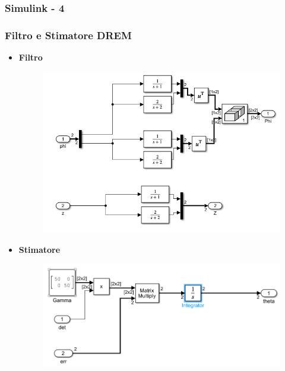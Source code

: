 \documentclass{beamer}
\begin{document}
\begin{frame}
	\frametitle{Simulink - 4}%
	\subsubsection{Filtro e Stimatore DREM}
	\begin{itemize}
		\item \textbf{Filtro}\begin{figure}
			\includegraphics[scale=0.25]{2022-05-09-17-14-27.png}%
		\end{figure}
		\item \textbf{Stimatore}\begin{figure}
			\includegraphics[scale=0.25]{2022-05-09-17-15-11.png}%
		\end{figure}
	\end{itemize}
\end{frame}
\end{document}
